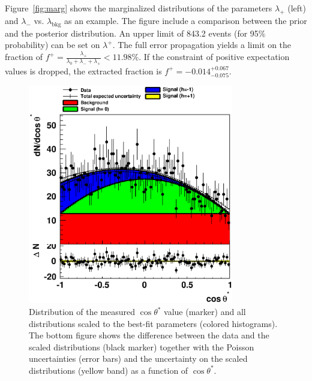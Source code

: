 \documentclass[11pt, a4paper]{article}
\begin{document}
Figure~\ref{fig:marg} shows the marginalized distributions of the
parameters $\lambda_{+}$ (left) and $\lambda_{-}$
vs. $\lambda_{\mathrm{bkg}}$ as an example. The figure include a
comparison between the prior and the posterior distribution. An upper
limit of 843.2 events (for 95\% probability) can be set on
$\lambda^{+}$. The full error propagation yields a limit on the
fraction of
$f^{+}=\frac{\lambda_{+}}{\lambda_{0}+\lambda_{-}+\lambda_{+}}<11.98\%$. If
the constraint of positive expectation values is dropped, the
extracted fraction is $f^{+}=-0.014^{+0.067}_{-0.075}$.\\

\begin{figure}
\begin{center}
\includegraphics[width=0.8\textwidth]{./fig/model_stack.eps}
\caption{Distribution of the measured $\cos \theta^{*}$ value
(marker) and all distributions scaled to the best-fit parameters
(colored histograms). The bottom figure shows the difference between
the data and the scaled distributions (black marker) together with the
Poisson uncertainties (error bars) and the uncertainty on the scaled
distributions (yellow band) as a function of $\cos
\theta^{*}$.}
\label{fig:stack}
\end{center}
\end{figure}
\end{document}
